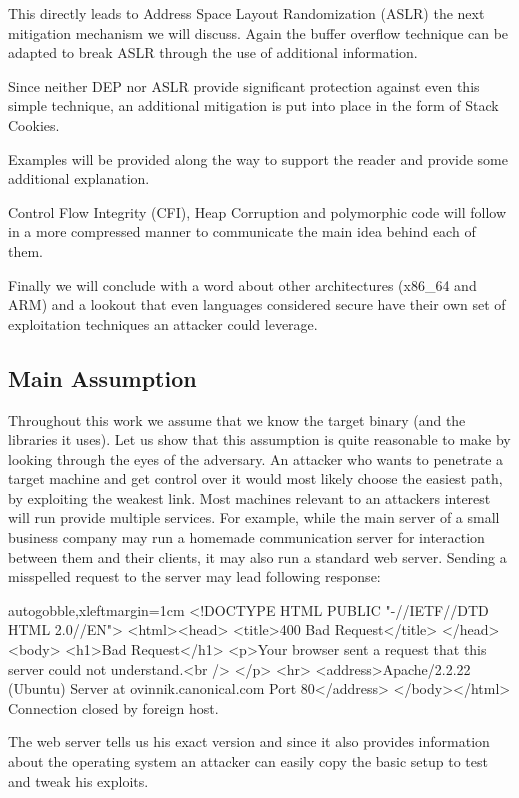 \documentclass[article]{uibk}
\begin{document}
This directly leads to Address Space Layout Randomization (ASLR) the next
mitigation mechanism we will discuss. Again the buffer overflow technique can
be adapted to break ASLR through the use of additional information.

Since neither DEP nor ASLR provide significant protection against even this
simple technique, an additional mitigation is put into place in the form of
Stack Cookies.

Examples will be provided along the way to support the reader and provide some
additional explanation.

Control Flow Integrity (CFI), Heap Corruption and polymorphic code will follow
in a more compressed manner to communicate the main idea behind each of them.

Finally we will conclude with a word about other architectures (x86\_64 and
ARM) and a lookout that even languages considered secure have their own set of
exploitation techniques an attacker could leverage.

\subsection{Main Assumption}

Throughout this work we assume that we know the target binary (and the
libraries it uses). Let us show that this assumption is quite reasonable to
make by looking through the eyes of the adversary. An attacker who wants to
penetrate a target machine and get control over it would most likely choose the
easiest path, by exploiting the weakest link. Most machines relevant to an
attackers interest will run provide multiple services. For example, while the
main server of a small business company may run a homemade communication server
for interaction between them and their clients, it may also run a standard web
server. Sending a misspelled request to the server may lead following response:

\begin{pre*}{autogobble,xleftmargin=1cm}
    <!DOCTYPE HTML PUBLIC "-//IETF//DTD HTML 2.0//EN">
    <html><head>
    <title>400 Bad Request</title>
    </head><body>
    <h1>Bad Request</h1>
    <p>Your browser sent a request that this server could not understand.<br />
    </p>
    <hr>
    <address>Apache/2.2.22 (Ubuntu) Server at ovinnik.canonical.com Port 80</address>
    </body></html>
    Connection closed by foreign host.
\end{pre*}

The web server tells us his exact version and since it also provides
information about the operating system an attacker can easily copy the basic
setup to test and tweak his exploits.
\end{document}
